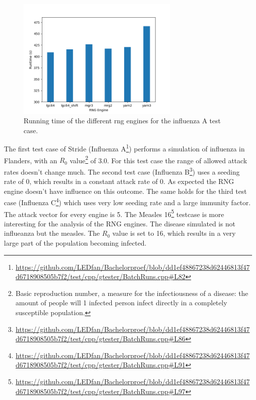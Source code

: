 \documentclass{acmart}
\begin{document}
\begin{figure}
    \centering
    \includegraphics[width=0.7\textwidth]{images/engine_performance_bar.png}
    \caption{Running time of the different rng engines for the influenza A test case.}
    \label{fig:engine:running}
\end{figure}


The first test case of Stride (Influenza A\footnote{\url{https://github.com/LEDfan/Bachelorproef/blob/dd1ef48867238d62446813f47d6718908505b7f2/test/cpp/gtester/BatchRuns.cpp\#L82}})
performs a simulation of influenza in Flanders, with an $R_0$ value\footnote{Basic reproduction number, a measure for the infectiousness of a disease: the amount of people will 1 infected person infect directly in a completely
susceptible population.} of 3.0. For this test case the range of allowed attack rates doesn't change much. 
The second test case (Influenza B\footnote{\url{https://github.com/LEDfan/Bachelorproef/blob/dd1ef48867238d62446813f47d6718908505b7f2/test/cpp/gtester/BatchRuns.cpp\#L86}}) uses a seeding rate of 0, which results in a constant attack rate of 0. As expected the RNG engine doesn't have influence on this outcome.
The same holds for the third test case (Influenza C\footnote{\url{https://github.com/LEDfan/Bachelorproef/blob/dd1ef48867238d62446813f47d6718908505b7f2/test/cpp/gtester/BatchRuns.cpp\#L91}}) which uses very low seeding rate and a large immunity factor. The attack vector for every engine is 5.
The Measles 16\footnote{\url{https://github.com/LEDfan/Bachelorproef/blob/dd1ef48867238d62446813f47d6718908505b7f2/test/cpp/gtester/BatchRuns.cpp\#L97}} testcase is more interesting for the analysis of the RNG engines. The disease simulated is not influeanza but the measles. The $R_0$ value is set to 16, which results in a very large part of the population becoming infected.
\end{document}
